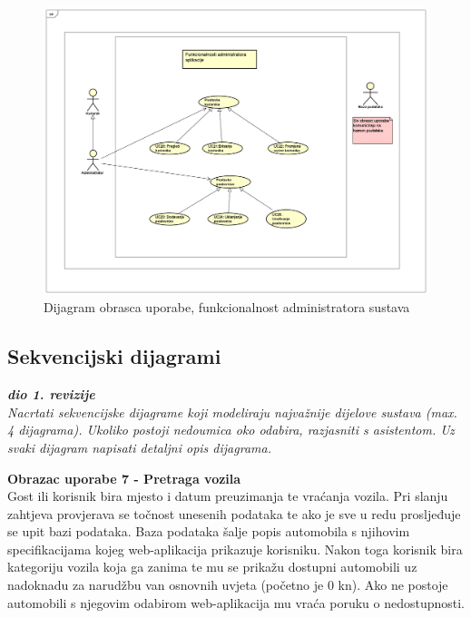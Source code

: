                 \begin{figure}[hp]
                    \centering
                    \includegraphics[width=15cm]{dokumentacija/slike/UseCaseDiagram2.png}
                    \caption{Dijagram obrasca uporabe, funkcionalnost administratora sustava}
                    \label{fig:useCase-2}
                \end{figure}
                
                
                \eject
				
			\subsection{Sekvencijski dijagrami}
				
				\textbf{\textit{dio 1. revizije}}\\
				
				\noindent\textit{Nacrtati sekvencijske dijagrame koji modeliraju najvažnije dijelove sustava (max. 4 dijagrama). Ukoliko postoji nedoumica oko odabira, razjasniti s asistentom. Uz svaki dijagram napisati detaljni opis dijagrama.}\newline

				\noindent\textbf{Obrazac uporabe 7 - Pretraga vozila}\\
				
				\noindent Gost ili korisnik bira mjesto i datum preuzimanja te
				vraćanja vozila. Pri slanju zahtjeva provjerava se točnost
				unesenih podataka te ako je sve u redu prosljeđuje se upit bazi
				podataka. Baza podataka šalje popis automobila s njihovim
				specifikacijama kojeg web-aplikacija prikazuje korisniku. Nakon
				toga korisnik bira kategoriju vozila koja ga zanima te mu se
				prikažu dostupni automobili uz nadoknadu za narudžbu van
				osnovnih uvjeta (početno je 0 kn). Ako ne postoje automobili s
				njegovim odabirom web-aplikacija mu vraća poruku o
				nedostupnosti.
				

